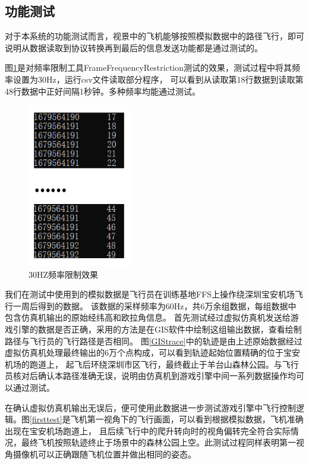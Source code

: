\subsection{功能测试}
对于本系统的功能测试而言，视景中的飞机能够按照模拟数据中的路径飞行，即可说明从数据读取到协议转换再到最后的信息发送功能都是通过测试的。
\par 
图\ref{synctest}是对频率限制工具FrameFrequencyRestriction测试的效果，测试过程中将其频率设置为30Hz，运行csv文件读取部分程序，
可以看到从读取第18行数据到读取第48行数据中正好间隔1秒钟。多种频率均能通过测试。

\begin{figure}[h!]
    \begin{center}
        \includegraphics[width=0.4\textwidth]{pictures/frame.png}
        \caption{30HZ频率限制效果}
        \label{synctest}
    \end{center}
\end{figure}
\par
我们在测试中使用到的模拟数据是飞行员在训练基地FFS上操作绕深圳宝安机场飞行一周后得到的数据。
该数据的采样频率为60Hz，共6万余组数据，每组数据中包含仿真机输出的原始经纬高和欧拉角信息。
首先测试经过虚拟仿真机发送给游戏引擎的数据是否正确，采用的方法是在GIS软件中绘制这组输出数据，查看绘制路径与飞行员的飞行路径是否相同。
图\ref{GIStrace}中的轨迹是由上述原始数据经过虚拟仿真机处理最终输出的6万个点构成，可以看到轨迹起始位置精确的位于宝安机场的跑道上，
起飞后环绕深圳市区飞行，最终截止于羊台山森林公园。与飞行员核对后确认本路径准确无误，说明由仿真机到游戏引擎中间一系列数据操作均可以通过测试。

\par
在确认虚拟仿真机输出无误后，便可使用此数据进一步测试游戏引擎中飞行控制逻辑。图\ref{firsttest}是飞机第一视角下的飞行画面，可以看到根据模拟数据，飞机准确出现在宝安机场跑道上，
且后续飞行中的爬升转向时的视角偏转完全符合实际情况，最终飞机按照轨迹终止于场景中的森林公园上空。此测试过程同样表明第一视角摄像机可以正确跟随飞机位置并做出相同的姿态。

